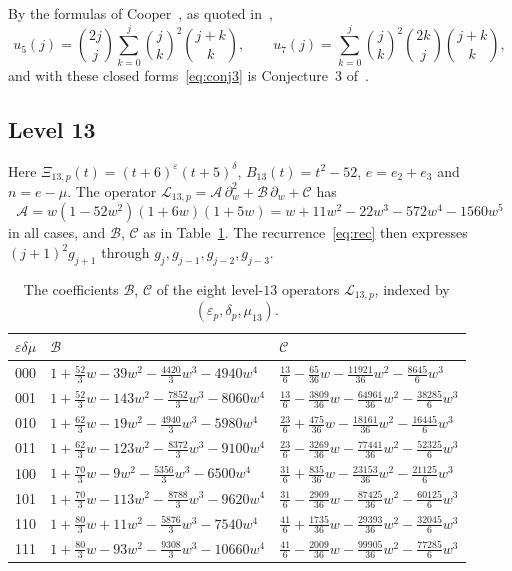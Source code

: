 \documentclass[11pt,a4paper]{article}
\theoremstyle{definition}
\theoremstyle{remark}
\newcommand{\cL}{\mathcal{L}}
\newcommand{\cA}{\mathcal{A}}
\newcommand{\cB}{\mathcal{B}}
\newcommand{\cC}{\mathcal{C}}
\newcommand{\dw}{\partial_w}
\numberwithin{equation}{section}
\begin{document}
By the formulas of Cooper~\cite[eq.~(5.41) and Theorem~7.32]{Cooper}, as quoted
in~\cite[p.~490]{Nakaya19},
\[
u_5(j)=\binom{2j}{j}\sum_{k=0}^{j}\binom jk^2\binom{j+k}{k},\qquad
u_7(j)=\sum_{k=0}^{j}\binom jk^2\binom{2k}{j}\binom{j+k}{k},
\]
and with these closed forms~\eqref{eq:conj3} is Conjecture~3
of~\cite{Nakaya19}.

\subsection{Level 13}

Here $\Xi_{13,p}(t)=(t+6)^{\varepsilon}(t+5)^{\delta}$, $B_{13}(t)=t^2-52$,
$e=e_2+e_3$ and $n=e-\mu$. The operator
$\cL_{13,p}=\cA\,\dw^2+\cB\,\dw+\cC$ has
\[
\cA=w(1-52w^2)(1+6w)(1+5w)=w+11w^2-22w^3-572w^4-1560w^5
\]
in all cases, and $\cB$, $\cC$ as in Table~\ref{tab:ops13}. The
recurrence~\eqref{eq:rec} then expresses $(j+1)^2g_{j+1}$ through
$g_j,g_{j-1},g_{j-2},g_{j-3}$.

\begin{table}[htbp]
\centering\footnotesize
\renewcommand{\arraystretch}{1.3}\setlength{\tabcolsep}{4pt}
\begin{tabular}{@{}c l l@{}}
\toprule
$\varepsilon\delta\mu$ & $\cB$ & $\cC$\\
\midrule
000 & $1+\frac{52}{3}w-39w^2-\frac{4420}{3}w^3-4940w^4$ & $\frac{13}{6}-\frac{65}{36}w-\frac{11921}{36}w^2-\frac{8645}{6}w^3$\\
001 & $1+\frac{52}{3}w-143w^2-\frac{7852}{3}w^3-8060w^4$ & $\frac{13}{6}-\frac{3809}{36}w-\frac{64961}{36}w^2-\frac{38285}{6}w^3$\\
010 & $1+\frac{62}{3}w-19w^2-\frac{4940}{3}w^3-5980w^4$ & $\frac{23}{6}+\frac{475}{36}w-\frac{18161}{36}w^2-\frac{16445}{6}w^3$\\
011 & $1+\frac{62}{3}w-123w^2-\frac{8372}{3}w^3-9100w^4$ & $\frac{23}{6}-\frac{3269}{36}w-\frac{77441}{36}w^2-\frac{52325}{6}w^3$\\
100 & $1+\frac{70}{3}w-9w^2-\frac{5356}{3}w^3-6500w^4$ & $\frac{31}{6}+\frac{835}{36}w-\frac{23153}{36}w^2-\frac{21125}{6}w^3$\\
101 & $1+\frac{70}{3}w-113w^2-\frac{8788}{3}w^3-9620w^4$ & $\frac{31}{6}-\frac{2909}{36}w-\frac{87425}{36}w^2-\frac{60125}{6}w^3$\\
110 & $1+\frac{80}{3}w+11w^2-\frac{5876}{3}w^3-7540w^4$ & $\frac{41}{6}+\frac{1735}{36}w-\frac{29393}{36}w^2-\frac{32045}{6}w^3$\\
111 & $1+\frac{80}{3}w-93w^2-\frac{9308}{3}w^3-10660w^4$ & $\frac{41}{6}-\frac{2009}{36}w-\frac{99905}{36}w^2-\frac{77285}{6}w^3$\\
\bottomrule
\end{tabular}
\caption{The coefficients $\cB$, $\cC$ of the eight level-$13$ operators
$\cL_{13,p}$, indexed by $(\varepsilon_p,\delta_p,\mu_{13})$.}
\label{tab:ops13}
\end{table}
\end{document}

